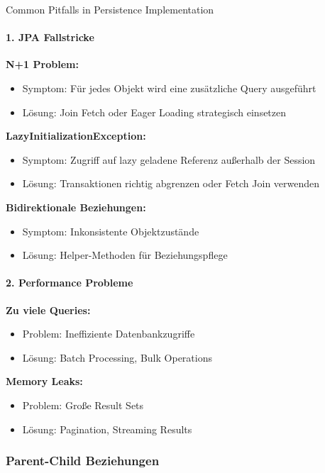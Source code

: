 \begin{concept}{Common Pitfalls in Persistence Implementation}
\paragraph{1. JPA Fallstricke}

    \textbf{N+1 Problem:}
    \begin{itemize}
        \item Symptom: Für jedes Objekt wird eine zusätzliche Query ausgeführt
        \item Lösung: Join Fetch oder Eager Loading strategisch einsetzen
    \end{itemize}
     \textbf{LazyInitializationException:}
    \begin{itemize}
        \item Symptom: Zugriff auf lazy geladene Referenz außerhalb der Session
        \item Lösung: Transaktionen richtig abgrenzen oder Fetch Join verwenden
    \end{itemize}
     \textbf{Bidirektionale Beziehungen:}
    \begin{itemize}
        \item Symptom: Inkonsistente Objektzustände
        \item Lösung: Helper-Methoden für Beziehungspflege
    \end{itemize}


\paragraph{2. Performance Probleme}
     \textbf{Zu viele Queries:}
    \begin{itemize}
        \item Problem: Ineffiziente Datenbankzugriffe
        \item Lösung: Batch Processing, Bulk Operations
    \end{itemize}
     \textbf{Memory Leaks:}
    \begin{itemize}
        \item Problem: Große Result Sets
        \item Lösung: Pagination, Streaming Results
    \end{itemize}
\end{concept}

\subsubsection{Parent-Child Beziehungen}

